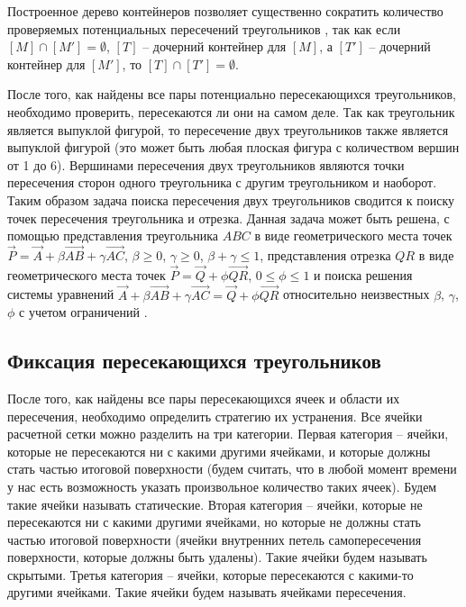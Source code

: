 \documentclass[
11pt,%
tightenlines,%
twoside,%
onecolumn,%
nofloats,%
nobibnotes,%
nofootinbib,%
superscriptaddress,%
noshowpacs,%
centertags]%
{revtex4}
\begin{document}
Построенное дерево контейнеров позволяет существенно сократить количество проверяемых потенциальных пересечений треугольников \cite{Jung}, так как если $[M] \cap [M'] = \emptyset$, $[T]$ -- дочерний контейнер для $[M]$, а $[T']$ -- дочерний контейнер для $[M']$, то $[T] \cap [T'] = \emptyset$.

После того, как найдены все пары потенциально пересекающихся треугольников, необходимо проверить, пересекаются ли они на самом деле.
Так как треугольник является выпуклой фигурой, то пересечение двух треугольников также является выпуклой фигурой (это может быть любая плоская фигура с количеством вершин от 1 до 6).
Вершинами пересечения двух треугольников являются точки пересечения сторон одного треугольника с другим треугольником и наоборот.
Таким образом задача поиска пересечения двух треугольников сводится к поиску точек пересечения треугольника и отрезка.
Данная задача может быть решена, с помощью представления треугольника $ABC$ в виде геометрического места точек $\vec{P} = \vec{A} + \beta \vec{AB} + \gamma \vec{AC}$, $\beta \ge 0$, $\gamma \ge 0$, $\beta + \gamma \le 1$, представления отрезка $QR$ в виде геометрического места точек $\vec{P} = \vec{Q} + \phi \vec{QR}$, $0 \le \phi \le 1$ и поиска решения системы уравнений $\vec{A} + \beta \vec{AB} + \gamma \vec{AC} = \vec{Q} + \phi \vec{QR}$ относительно неизвестных $\beta$, $\gamma$, $\phi$ с учетом ограничений \cite{Freylekhman}.

\subsection{Фиксация пересекающихся треугольников}

После того, как найдены все пары пересекающихся ячеек и области их пересечения, необходимо определить стратегию их устранения.
Все ячейки расчетной сетки можно разделить на три категории.
Первая категория -- ячейки, которые не пересекаются ни с какими другими ячейками, и которые должны стать частью итоговой поверхности (будем считать, что в любой момент времени у нас есть возможность указать произвольное количество таких ячеек).
Будем такие ячейки называть статические.
Вторая категория -- ячейки, которые не пересекаются ни с какими другими ячейками, но которые не должны стать частью итоговой поверхности (ячейки внутренних петель самопересечения поверхности, которые должны быть удалены).
Такие ячейки будем называть скрытыми.
Третья категория -- ячейки, которые пересекаются с какими-то другими ячейками. 
Такие ячейки будем называть ячейками пересечения.
\end{document}
